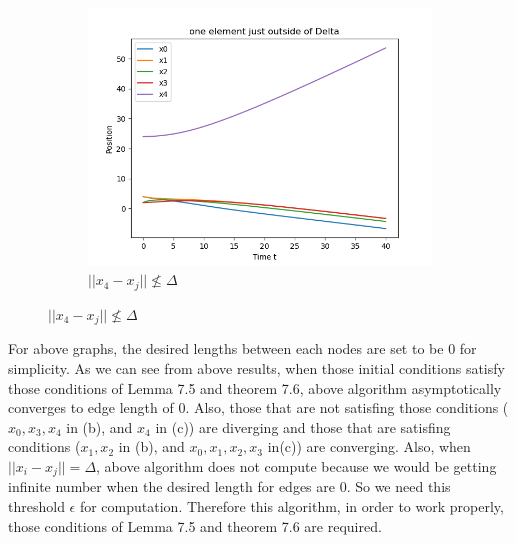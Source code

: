 \documentclass{article}
\begin{document}
\begin{problem}
\begin{figure}[!h]
        \begin{subfigure}{0.3\textwidth}
            \includegraphics[width=\textwidth]{./img/p3_3.png}
            \caption{$||x_4 - x_j|| \nleq \Delta$ }
        \end{subfigure}
    \end{figure}

    For above graphs, the desired lengths between each nodes are set to be 0 for simplicity. As we can see from above results, when those initial conditions satisfy those conditions of Lemma 7.5 and theorem 7.6, above algorithm asymptotically converges to edge length of 0. Also, those that are not satisfing those conditions ($x_0, x_3, x_4$ in (b), and $x_4$ in (c)) are diverging and those that are satisfing conditions ($x_1, x_2$ in (b), and $x_0, x_1, x_2, x_3$ in(c)) are converging. Also, when $||x_i - x_j|| = \Delta$, above algorithm does not compute because we would be getting infinite number when the desired length for edges are 0. So we need this threshold $\epsilon$ for computation. Therefore this algorithm, in order to work properly, those conditions of Lemma 7.5 and theorem 7.6 are required. 
\end{problem}
\end{document}
